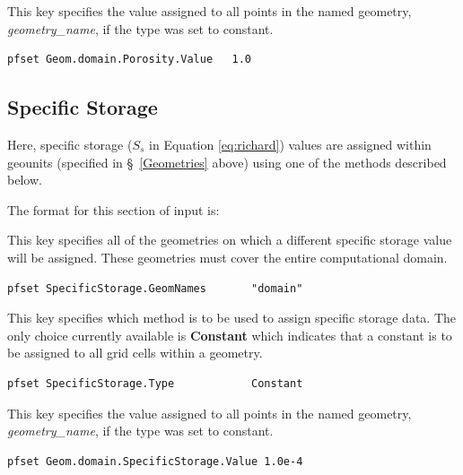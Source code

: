{
This key specifies the value assigned to all points in the named
geometry, {\em geometry\_name}, if the type was set to constant.
}
\begin{display}\begin{verbatim}
pfset Geom.domain.Porosity.Value   1.0
\end{verbatim}\end{display}

\subsection{Specific Storage}
\label{Specific Storage}

Here, specific storage ($S_s$ in Equation \ref{eq:richard}) values are assigned within geounits (specified in
\S~\ref{Geometries} above) using one of the methods described below.

The format for this section of input is:

{
This key specifies all of the geometries on which a different specific storage value will be
assigned.  These geometries must cover the entire computational domain.
}
\begin{display}\begin{verbatim}
pfset SpecificStorage.GeomNames       "domain"
\end{verbatim}\end{display}

{
This key specifies which method is to be used to assign specific storage data.  The only choice currently
available is {\bf Constant} which indicates that a constant is to be
assigned to all grid cells within a geometry.
}
\begin{display}\begin{verbatim}
pfset SpecificStorage.Type            Constant
\end{verbatim}\end{display}

{
This key specifies the value assigned to all points in the named
geometry, {\em geometry\_name}, if the type was set to constant.
}
\begin{display}\begin{verbatim}
pfset Geom.domain.SpecificStorage.Value 1.0e-4
\end{verbatim}\end{display}

